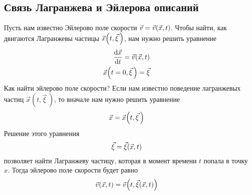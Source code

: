 \subsection{Связь Лагранжева и Эйлерова описаний}
Пусть нам известно Эйлерово поле скорости $ \vec{v}=\vec{v}\qty(\vec{x}, t) $. Чтобы найти, как двигаются Лагранжевы частицы $ \vec{x}\qty(t, \vec{\xi}\,) $, нам нужно решить уравнение
\begin{align*} 
\dv{\vec{x}}{t}=\vec{v}\qty(\vec{x}, t) \\
\vec{x}\qty(t=0, \vec{\xi}\,)=\vec{\xi}
\end{align*}
Как найти эйлерово поле скорости? Если нам известно поведение лагранжевых частиц $ \vec{x}(t, \vec{\xi}\,) $, то вначале нам нужно решить уравнение 
\begin{align*} 
\vec{x}=\vec{x}\qty(t, \vec{\xi}\,)
\end{align*}
Решение этого уравнения 
\begin{align*} 
\vec{\xi}=\vec{\xi}\qty(\vec{x}, t)
\end{align*}
позволяет найти Лагранжеву частицу, которая в момент времени $t$ попала в точку $x$. Тогда эйлерово поле скорости будет равно
\begin{align*} 
\vec{v}(\vec{x}, t)=\vec{v}\qty(t, \vec{\xi}(\vec{x}, t))
\end{align*}




